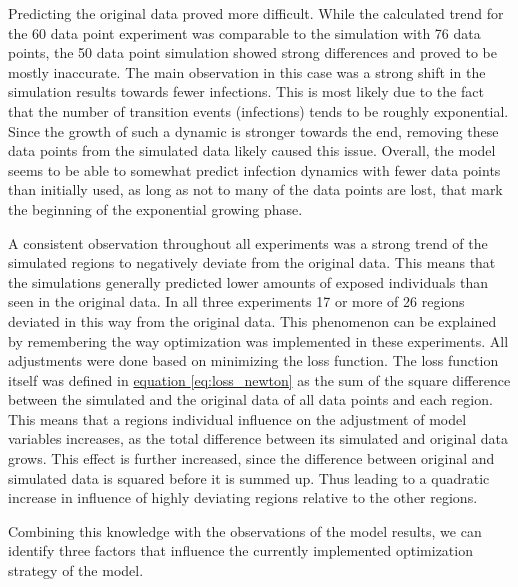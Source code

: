 
Predicting the original data proved more difficult. While the calculated trend for the 60 data point experiment was comparable
to the simulation with 76 data points, the 50 data point simulation showed strong differences and proved to be mostly inaccurate.
The main observation in this case was a strong shift in the simulation results towards fewer infections.
This is most likely due to the fact that the number of transition events (infections) tends to be roughly exponential.
Since the growth of such a dynamic is stronger towards the end, removing these data points from the simulated data likely
caused this issue. Overall, the model seems to be able to somewhat predict infection dynamics with fewer data points than
initially used, as long as not to many of the data points are lost, that mark the beginning of the exponential growing phase.

A consistent observation throughout all experiments was a strong trend of the simulated regions to negatively deviate from the
original data. This means that the simulations generally predicted lower amounts of exposed individuals than seen in the original
data. In all three experiments 17 or more of 26 regions deviated in this way from the original data. This phenomenon can be explained
by remembering the way optimization was implemented in these experiments.
All adjustments were done based on minimizing the loss function. The loss function itself was defined in
\hyperref[eq:loss_newton]{equation \ref*{eq:loss_newton}} as the sum of the square difference between the simulated and the original
data of all data points and each region. This means that a regions individual influence on the adjustment of model variables
increases, as the total difference between its simulated and original data grows. This effect is further increased, since the
difference between original and simulated data is squared before it is summed up. Thus leading to a quadratic increase in influence
of highly deviating regions relative to the other regions. \newline

Combining this knowledge with the observations of the model results, we can identify three factors that influence
the currently implemented optimization strategy of the model.\newline

